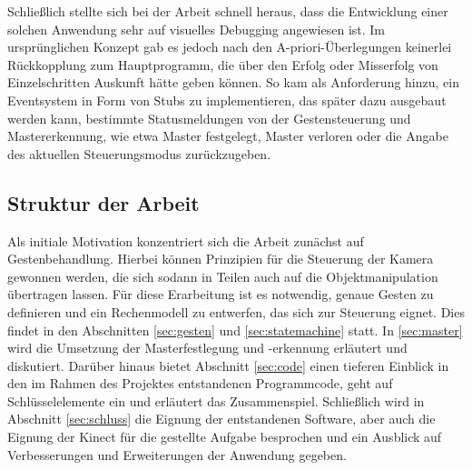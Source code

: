 	Schließlich stellte sich bei der Arbeit schnell heraus, dass die Entwicklung einer solchen Anwendung sehr auf visuelles Debugging angewiesen ist. Im ursprünglichen Konzept gab es jedoch nach den A-priori-Überlegungen keinerlei Rückkopplung zum Hauptprogramm, die über den Erfolg oder Misserfolg von Einzelschritten Auskunft hätte geben können. So kam als Anforderung hinzu, ein Eventsystem in Form von Stubs zu implementieren, das später dazu ausgebaut werden kann, bestimmte Statusmeldungen von der Gestensteuerung und Mastererkennung, wie etwa \glqq{}Master festgelegt\grqq{}, \glqq{}Master verloren\grqq{} oder die Angabe des aktuellen Steuerungsmodus zurückzugeben.


\subsection{Struktur der Arbeit}
Als initiale Motivation konzentriert sich die Arbeit zunächst auf Gestenbehandlung. Hierbei können Prinzipien für die Steuerung der Kamera gewonnen werden, die sich sodann in Teilen auch auf die Objektmanipulation übertragen lassen. Für diese Erarbeitung ist es notwendig, genaue Gesten zu definieren und ein Rechenmodell zu entwerfen, das sich zur Steuerung eignet. Dies findet in den Abschnitten \ref{sec:gesten} und \ref{sec:statemachine} statt. In \ref{sec:master} wird die Umsetzung der Masterfestlegung und -erkennung erläutert und diskutiert. Darüber hinaus bietet Abschnitt \ref{sec:code} einen tieferen Einblick in den im Rahmen des Projektes entstandenen Programmcode, geht auf Schlüsselelemente ein und erläutert das Zusammenspiel. Schließlich wird in Abschnitt \ref{sec:schluss} die Eignung der entstandenen Software, aber auch die Eignung der Kinect für die gestellte Aufgabe besprochen und ein Ausblick auf Verbesserungen und Erweiterungen der Anwendung gegeben.\par 
	

	

